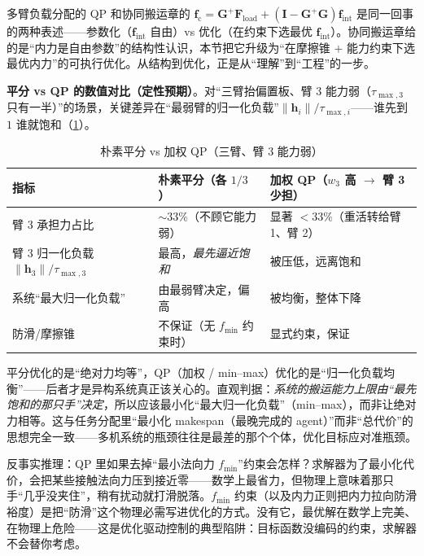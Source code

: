 \begin{insight}
多臂负载分配的 QP 和协同搬运章的 $\mathbf{f}_{\text{c}}=\mathbf{G}^{+}\mathbf{F}_{\text{load}}+(\mathbf{I}-\mathbf{G}^{+}\mathbf{G})\mathbf{f}_{\text{int}}$ 是同一回事的两种表述——参数化（$\mathbf{f}_{\text{int}}$ 自由）vs 优化（在约束下选最优 $\mathbf{f}_{\text{int}}$）。协同搬运章给的是“内力是自由参数”的结构性认识，本节把它升级为“在摩擦锥 $+$ 能力约束下选最优内力”的可执行优化。从结构到优化，正是从“理解”到“工程”的一步。
\end{insight}

\textbf{平分 vs QP 的数值对比（定性预期）}。对“三臂抬偏置板、臂 3 能力弱（$\tau_{\max,3}$ 只有一半）”的场景，关键差异在“最弱臂的归一化负载”$\|\mathbf{h}_i\|/\tau_{\max,i}$——谁先到 $1$ 谁就饱和（\cref{tab:ma-equal-vs-qp}）。

\begin{table}[H]\centering\small
\caption{朴素平分 vs 加权 QP（三臂、臂 3 能力弱）}
\label{tab:ma-equal-vs-qp}
\begin{tabular}{lll}
\toprule
指标 & 朴素平分（各 $1/3$） & 加权 QP（$w_3$ 高 $\to$ 臂 3 少担） \\
\midrule
臂 3 承担力占比 & $\sim33\%$（不顾它能力弱） & 显著 $<33\%$（重活转给臂 1、臂 2） \\
臂 3 归一化负载 $\|\mathbf{h}_3\|/\tau_{\max,3}$ & 最高，\emph{最先逼近饱和} & 被压低，远离饱和 \\
系统“最大归一化负载” & 由最弱臂决定，偏高 & 被均衡，整体下降 \\
防滑/摩擦锥 & 不保证（无 $f_{\min}$ 约束时） & 显式约束，保证 \\
\bottomrule
\end{tabular}
\end{table}

\begin{insight}
平分优化的是“绝对力均等”，QP（加权 / min--max）优化的是“归一化负载均衡”——后者才是异构系统真正该关心的。直观判据：\emph{系统的搬运能力上限由“最先饱和的那只手”决定}，所以应该最小化“最大归一化负载”（min--max），而非让绝对力相等。这与任务分配里“最小化 makespan（最晚完成的 agent）”而非“总代价”的思想完全一致——多机系统的瓶颈往往是最差的那个个体，优化目标应对准瓶颈。
\end{insight}

\begin{insight}
反事实推理：QP 里如果去掉“最小法向力 $f_{\min}$”约束会怎样？求解器为了最小化代价，会把某些接触法向力压到接近零——数学上最省力，但物理上意味着那只手“几乎没夹住”，稍有扰动就打滑脱落。$f_{\min}$ 约束（以及内力正则把内力拉向防滑裕度）是把“防滑”这个物理必需写进优化的方式。没有它，最优解在数学上完美、在物理上危险——这是优化驱动控制的典型陷阱：目标函数没编码的约束，求解器不会替你考虑。
\end{insight}

